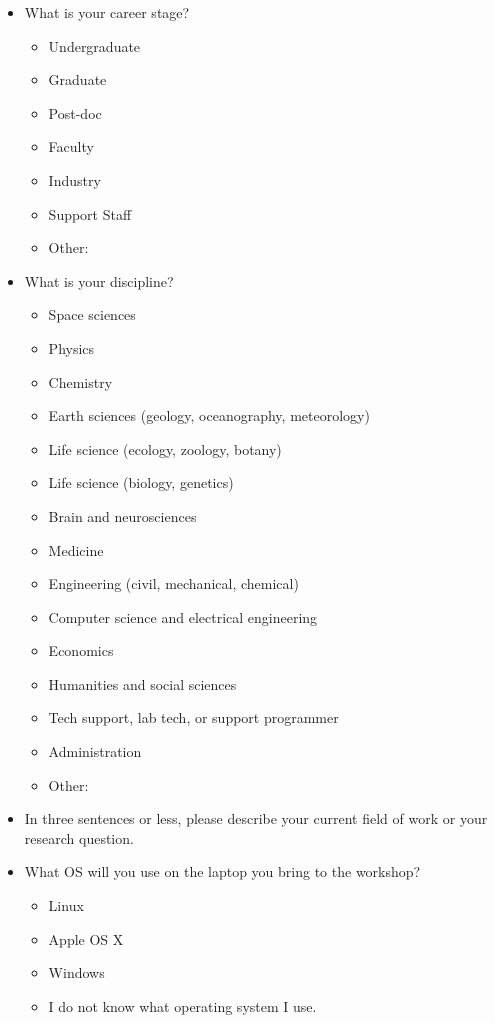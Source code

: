 \documentclass[10pt,a4paper,twocolumn]{article}
\begin{document}
\begin{itemize}

\item
  What is your career stage?
  \begin{itemize}[noitemsep]
    \item Undergraduate
    \item Graduate
    \item Post-doc
    \item Faculty
    \item Industry
    \item Support Staff
    \item Other:
  \end{itemize}

\item
  What is your discipline?
  \begin{itemize}[noitemsep]
    \item Space sciences
    \item Physics
    \item Chemistry
    \item Earth sciences (geology, oceanography, meteorology)
    \item Life science (ecology, zoology, botany)
    \item Life science (biology, genetics)
    \item Brain and neurosciences
    \item Medicine
    \item Engineering (civil, mechanical, chemical)
    \item Computer science and electrical engineering
    \item Economics
    \item Humanities and social sciences
    \item Tech support, lab tech, or support programmer
    \item Administration
    \item Other:
  \end{itemize}

\item
  In three sentences or less, please describe your current field of
  work or your research question.

\item
  What OS will you use on the laptop you bring to the workshop?
  \begin{itemize}[noitemsep]
    \item Linux
    \item Apple OS X
    \item Windows
    \item I do not know what operating system I use.
  \end{itemize}


\end{itemize}
\end{document}
